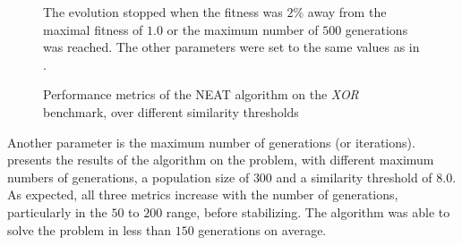 \begin{figure}
\begin{center}
    \end{center}
    \caption{Performance metrics of the NEAT algorithm on the \textit{XOR} benchmark, over different similarity thresholds}
    {The evolution stopped when the fitness was $2\%$ away from the maximal fitness of $1.0$ or the maximum number of $500$ generations was reached.
    The other parameters were set to the same values as in \cite{neat}.}
    \label{fig:neat_xor_similarity}
\end{figure}

Another parameter is the maximum number of generations (or iterations). presents the results of the algorithm on the problem, with different maximum numbers of generations,
a population size of $300$ and a similarity threshold of $8.0$. As expected, all three metrics increase with the number of generations, particularly in the $50$ to $200$ range, before stabilizing.
The algorithm was able to solve the problem in less than $150$ generations on average.

